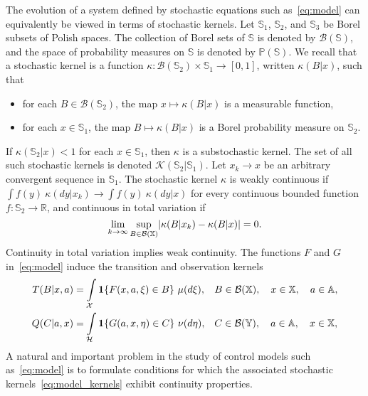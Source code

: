 \documentclass[11pt,onecolumn]{IEEEtran}  %
\newcommand{\Ab}{\mathbb{A}}
\newcommand{\Pb}{\mathbb{P}}
\newcommand{\Rb}{\mathbb{R}}
\newcommand{\Sb}{\mathbb{S}}
\newcommand{\Xb}{\mathbb{X}}
\newcommand{\Yb}{\mathbb{Y}}
\newcommand{\Bc}{\mathcal{B}}
\newcommand{\Kc}{\mathcal{K}}
\newcommand{\Xc}{\mathcal{X}}
\newcommand{\Hc}{\mathcal{H}}
\newcommand{\one}[1]{\mathbf{1}\set{#1}}
\DeclarePairedDelimiter{\set}{\{}{\}}
\DeclarePairedDelimiter{\abs}{|}{|}
\theoremstyle{definition}
\begin{document}
The evolution of a system defined by stochastic equations such as~\eqref{eq:model} can equivalently be viewed in terms of stochastic kernels. Let $\Sb_1$, $\Sb_2$, and $\Sb_3$ be Borel subsets of Polish spaces. The collection of Borel sets of $\Sb$ is denoted by $\Bc(\Sb)$, and the space of probability measures on $\Sb$ is denoted by $\Pb(\Sb)$. We recall that a stochastic kernel is a function $\kappa : \Bc(\Sb_2) \times \Sb_1 \to [0,1]$, written $\kappa(B|x)$, such that
\begin{itemize}
    \item for each $B \in \Bc(\Sb_2)$, the map $x \mapsto \kappa(B|x)$ is a measurable function,
    \item for each $x \in \Sb_1$, the map $B \mapsto \kappa(B|x)$ is a Borel probability measure on $\Sb_2$.
\end{itemize}
If $\kappa(\Sb_2|x) < 1$ for each $x \in \Sb_1$, then $\kappa$ is a substochastic kernel.
The set of all such stochastic kernels is denoted $\Kc(\Sb_2| \Sb_1)$. Let $x_k \to x$ be an arbitrary convergent sequence in $\Sb_1$. The stochastic kernel $\kappa$ is weakly continuous if $\int f(y) \ \kappa(dy|x_k) \to \int f(y) \ \kappa(dy|x)$ for every continuous bounded function $f : \Sb_2 \to \Rb$, and continuous in total variation if
\begin{equation*}
    \lim_{k \to \infty} \sup_{B \in \Bc(\Xb)} \abs{\kappa(B|x_k) - \kappa(B|x)} = 0.
\end{equation*}
Continuity in total variation implies weak continuity.
The functions $F$ and $G$ in~\eqref{eq:model} induce the transition and observation kernels
\begin{subequations} \label{eq:model_kernels}
\begin{align}
    T(B|x, a) &= \int\limits_{\Xc} \one{F(x, a, \xi) \in B} \ \mu(d\xi), && B \in \Bc (\Xb), \quad x \in \Xb, \quad a \in \Ab, \label{eq:transition_kernel} \\
    Q(C|a, x) & =\int\limits_{\Hc}\one{G(a, x, \eta) \in C} \ \nu(d\eta), && C \in \Bc (\Yb), \quad a \in \Ab, \quad x \in \Xb, \label{eq:observation_kernel}
\end{align}
\end{subequations}
A natural and important problem in the study of control models such as~\eqref{eq:model} is to formulate conditions for which the associated stochastic kernels~\eqref{eq:model_kernels} exhibit continuity properties.
\end{document}

